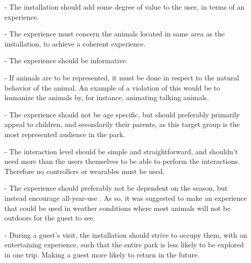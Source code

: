 \begin{itemize}
    \item[-] The installation should add some degree of value to the user, in terms of an experience. 
    \item[-] The experience must concern the animals located in same area as the installation, to achieve a coherent experience.
    \item [-] The experience should be informative.
    \item[-] If animals are to be represented, it must be done in respect to the natural behavior of the animal. An example of a violation of this would be to humanize the animals by, for instance, animating talking animals. 
    \item[-] The experience should not be age specific, but should preferably primarily appeal to children, and secondarily their parents, as this target group is the most represented audience in the park. 
    \item[-] The interaction level should be simple and straightforward, and shouldn't need more than the users themselves to be able to perform the interactions. Therefore no controllers or wearables must be used. 
    \item[-] The experience should preferably not be dependent on the season, but instead encourage all-year-use . As so, it was suggested to make an experience that could be used in weather conditions where most animals will not be outdoors for the guest to see.
    \item[-] During a guest's visit, the installation should strive to occupy them, with an entertaining experience, such that the entire park is less likely to be explored in one trip. Making a guest more likely to return in the future.
\end{itemize}

   









